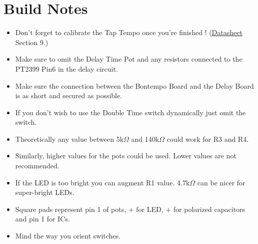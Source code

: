 \documentclass[a4paper, 10pt]{article}
\begin{document}
\section{Build Notes}
\begin{itemize}
\item Don't forget to calibrate the Tap Tempo once you're finished ! (\href{https://electric-canary.com/assets/bontempo---datasheet.pdf}{\underline{Datasheet}} Section 9.)
\item Make sure to omit the Delay Time Pot and any resistors connected to the PT2399 Pin6 in the delay circuit. 
\item Make sure the connection between the Bontempo Board and the Delay Board is as short and secured as possible. 
\item If you don't wish to use the Double Time switch dynamically just omit the switch.
\item Theoretically any value between 5k$\Omega$ and 140k$\Omega$ could work for R3 and R4.
\item Similarly, higher values for the pots could be used. Lower values are not recommended.
\item If the LED is too bright you can augment R1 value. 4.7k$\Omega$ can be nicer for super-bright LEDs.
\item Square pads represent pin 1 of pots, + for LED, + for polarized capacitors and pin 1 for ICs.
\item Mind the way you orient switches.
\end{itemize}
\end{document}
